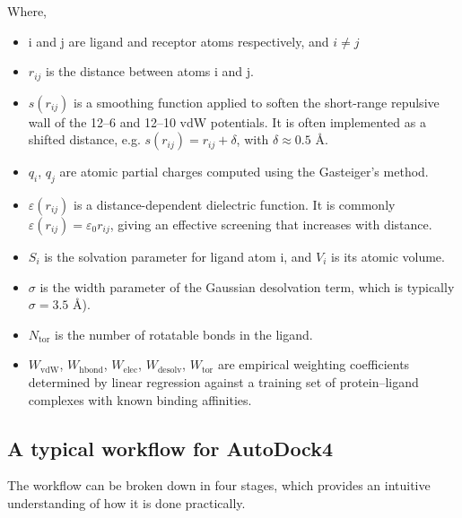 \documentclass[12pt, a4paper]{article}
\begin{document}
Where,
\begin{itemize}
  \item  i and j are ligand and receptor atoms respectively, and $i \neq j$
  \item $r_{ij}$ is the distance between atoms i  and  j.
  \item $s(r_{ij})$ is a smoothing function applied to soften the short-range repulsive wall of the 12--6 and 12--10 vdW potentials. It is often implemented as a shifted distance, e.g. $ s(r_{ij}) = r_{ij} + \delta $, with $ \delta \approx 0.5 $ \r{A}.
  \item $ q_i$, $q_j$ are atomic partial charges computed using the Gasteiger's method\cite{CH7_gasteiger}.
  \item $ \varepsilon(r_{ij})$ is a distance-dependent dielectric function. It is commonly $ \varepsilon(r_{ij}) = \varepsilon_0 r_{ij} $, giving an effective screening that increases with distance.
  \item $S_i$ is the solvation parameter for ligand atom i, and $V_i$ is its atomic volume.
  \item $\sigma$ is the width parameter of the Gaussian desolvation term, which is typically $\sigma = 3.5$ \r{A}).
  \item $ N_{\text{tor}}$ is the number of rotatable bonds in the ligand.
  \item $ W_{\text{vdW}}$, $W_{\text{hbond}}$, $W_{\text{elec}}$, $W_{\text{desolv}}$, $W_{\text{tor}}$ are empirical weighting coefficients determined by linear regression against a training set of protein--ligand complexes with known binding affinities. 
\end{itemize}


\subsection{A typical workflow for AutoDock4}

The workflow can be broken down in four stages, which provides an intuitive understanding of how it is done practically.
\end{document}
